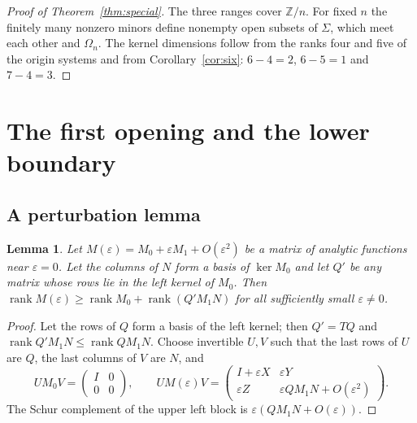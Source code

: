 \documentclass{amsart}
\newtheorem{lemma}[theorem]{Lemma}
\theoremstyle{definition}
\theoremstyle{remark}
\numberwithin{equation}{section}
\newcommand{\ZZ}{\mathbb{Z}}
\DeclareMathOperator{\rank}{rank}
\begin{document}
\begin{proof}[Proof of Theorem~\ref{thm:special}]
The three ranges cover $\ZZ/n$. For fixed $n$ the finitely many nonzero minors define
nonempty open subsets of $\Sigma$, which meet each other and $\Omega_n$. The kernel
dimensions follow from the ranks four and five of the origin systems and from
Corollary~\ref{cor:six}: $6-4=2$, $6-5=1$ and $7-4=3$.
\end{proof}

\section{The first opening and the lower boundary}\label{sec:opening}

\subsection{A perturbation lemma}
\begin{lemma}\label{lem:perturb}
Let $M(\varepsilon)=M_0+\varepsilon M_1+O(\varepsilon^2)$ be a matrix of analytic
functions near $\varepsilon=0$. Let the columns of $N$ form a basis of $\ker M_0$ and
let $Q'$ be any matrix whose rows lie in the left kernel of $M_0$. Then
$\rank M(\varepsilon)\ge\rank M_0+\rank(Q'M_1N)$ for all sufficiently small
$\varepsilon\ne0$.
\end{lemma}

\begin{proof}
Let the rows of $Q$ form a basis of the left kernel; then $Q'=TQ$ and
$\rank Q'M_1N\le\rank QM_1N$. Choose invertible $U,V$ such that the last rows of $U$ are $Q$, the last columns of
$V$ are $N$, and
\[
  UM_0V=\begin{pmatrix}I&0\\0&0\end{pmatrix},\qquad
  UM(\varepsilon)V=\begin{pmatrix}I+\varepsilon X&\varepsilon Y\\
  \varepsilon Z&\varepsilon QM_1N+O(\varepsilon^2)\end{pmatrix}.
\]
The Schur complement of the upper left block is $\varepsilon(QM_1N+O(\varepsilon))$.
\end{proof}
\end{document}
